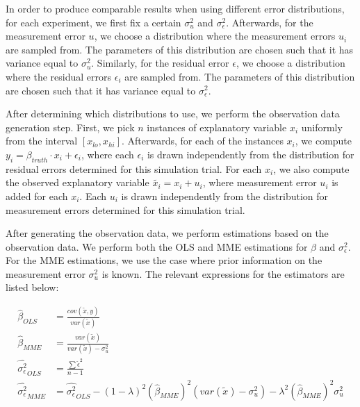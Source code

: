 \documentclass{article}
\begin{document}
In order to produce comparable results when using different error distributions, for each experiment, we first fix a certain $\sigma^2_u$ and $\sigma^2_\epsilon$.
Afterwards, for the measurement error $u$, we choose a distribution where the measurement errors $u_i$ are sampled from.
The parameters of this distribution are chosen such that it has variance equal to $\sigma_u^2$.
Similarly, for the residual error $\epsilon$, we choose a distribution where the residual errors $\epsilon_i$ are sampled from.
The parameters of this distribution are chosen such that it has variance equal to $\sigma_\epsilon^2$.

After determining which distributions to use, we perform the observation data generation step.
First, we pick $n$ instances of explanatory variable $x_i$ uniformly from the interval $[x_{lo}, x_{hi}]$.
Afterwards, for each of the instances $x_i$, we compute $y_i = \beta_{truth} \cdot x_i + \epsilon_i$, where each $\epsilon_i$ is drawn independently from the distribution for residual errors determined for this simulation trial.
For each $x_i$, we also compute the observed explanatory variable $\tilde{x_i} = x_i + u_i$, where measurement error $u_i$ is added for each $x_i$. Each $u_i$ is drawn independently from the distribution for measurement errors determined for this simulation trial.

After generating the observation data, we perform estimations based on the observation data. We perform both the OLS and MME estimations for $\beta$ and $\sigma_\epsilon^2$. For the MME estimations, we use the case where prior information on the measurement error $\sigma_u^2$ is known. The relevant expressions for the estimators are listed below:

\begin{equation}
    \begin{split}
        \hat{\beta}_{OLS} &= \frac{cov(\tilde{x}, y)}{var(\tilde{x})}\\
        \hat{\beta}_{MME} &= \frac{var(\tilde{x})}{var(\tilde{x}) - \sigma^2_u}\\
        \hat{\sigma^2_\epsilon}_{OLS} &= \frac{\sum \hat{\epsilon}^2}{n-1}\\
        \hat{\sigma_\epsilon^2}_{MME} &= \hat{\sigma^2_\epsilon}_{OLS} -  (1-\lambda)^2 (\hat{\beta}_{MME})^2 (var(\tilde{x}) - \sigma^2_u) - \lambda^2 (\hat{\beta}_{MME})^2 \sigma_u^2\\
    \end{split}
\end{equation}
\end{document}
